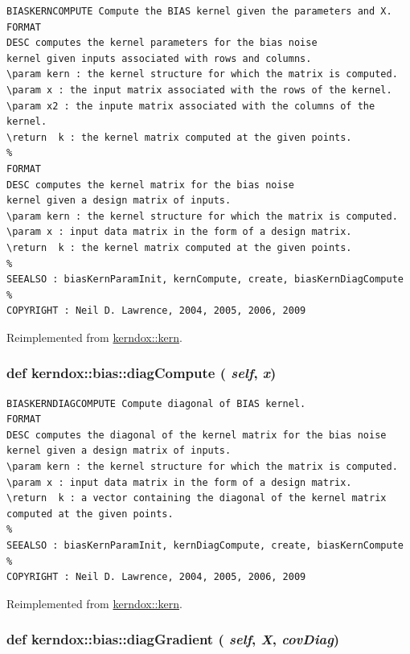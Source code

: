 \footnotesize\begin{verbatim}BIASKERNCOMPUTE Compute the BIAS kernel given the parameters and X.
FORMAT
DESC computes the kernel parameters for the bias noise
kernel given inputs associated with rows and columns.
\param kern : the kernel structure for which the matrix is computed.
\param x : the input matrix associated with the rows of the kernel.
\param x2 : the inpute matrix associated with the columns of the kernel.
\return  k : the kernel matrix computed at the given points.
%
FORMAT
DESC computes the kernel matrix for the bias noise
kernel given a design matrix of inputs.
\param kern : the kernel structure for which the matrix is computed.
\param x : input data matrix in the form of a design matrix.
\return  k : the kernel matrix computed at the given points.
%
SEEALSO : biasKernParamInit, kernCompute, create, biasKernDiagCompute
%
COPYRIGHT : Neil D. Lawrence, 2004, 2005, 2006, 2009

\end{verbatim}
\normalsize
 

Reimplemented from \hyperlink{classkerndox_1_1kern}{kerndox::kern}.\hypertarget{classkerndox_1_1bias_2a8cdcea02456f6083c608daa0e8449a}{
\subsubsection[{diagCompute}]{\setlength{\rightskip}{0pt plus 5cm}def kerndox::bias::diagCompute ( {\em self}, \/   {\em x})}}
\label{classkerndox_1_1bias_2a8cdcea02456f6083c608daa0e8449a}




\footnotesize\begin{verbatim}BIASKERNDIAGCOMPUTE Compute diagonal of BIAS kernel.
FORMAT
DESC computes the diagonal of the kernel matrix for the bias noise kernel given a design matrix of inputs.
\param kern : the kernel structure for which the matrix is computed.
\param x : input data matrix in the form of a design matrix.
\return  k : a vector containing the diagonal of the kernel matrix
computed at the given points.
%
SEEALSO : biasKernParamInit, kernDiagCompute, create, biasKernCompute
%
COPYRIGHT : Neil D. Lawrence, 2004, 2005, 2006, 2009

\end{verbatim}
\normalsize
 

Reimplemented from \hyperlink{classkerndox_1_1kern}{kerndox::kern}.\hypertarget{classkerndox_1_1bias_66d203c06ed866e4f1c9a09e13a9a142}{
\subsubsection[{diagGradient}]{\setlength{\rightskip}{0pt plus 5cm}def kerndox::bias::diagGradient ( {\em self}, \/   {\em X}, \/   {\em covDiag})}}
\label{classkerndox_1_1bias_66d203c06ed866e4f1c9a09e13a9a142}




